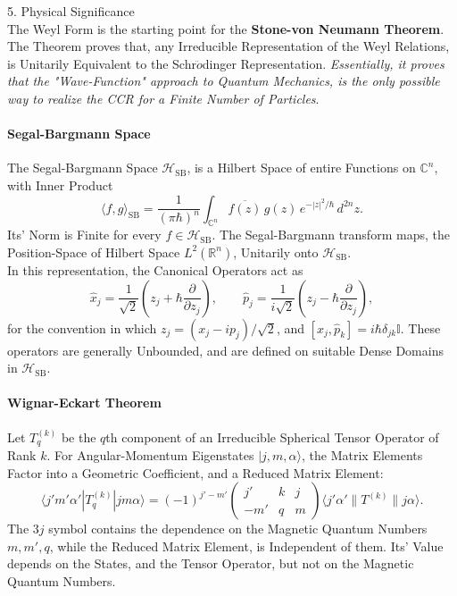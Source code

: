 \documentclass[a4paper, 10pt, onepage]{elegantbook}
\begin{document}
{\noindent

   5. Physical Significance  \\

The Weyl Form is the starting point for the \textbf{Stone-von Neumann Theorem}. The Theorem proves that, any Irreducible Representation of the Weyl Relations, is Unitarily Equivalent to the Schr$\ddot{o}$dinger Representation. \emph{Essentially, it proves that the "Wave-Function" approach to Quantum Mechanics, is the only possible way to realize the CCR for a Finite Number of Particles}. 

\newpage


\paragraph{Segal-Bargmann Space}

The Segal-Bargmann Space $\mathcal{H}_{\mathrm{SB}}$, is a Hilbert Space of entire Functions on $\mathbb{C}^n$, with Inner Product
\[
\langle f,g\rangle_{\mathrm{SB}}
=
\frac{1}{(\pi\hbar)^n}
\int_{\mathbb{C}^n}
\overline{f(z)}\,g(z)\,
e^{-|z|^2/\hbar}\,d^{2n}z.
\]
Its' Norm is Finite for every $f\in\mathcal{H}_{\mathrm{SB}}$. The Segal-Bargmann transform maps, the Position-Space of Hilbert Space $L^2(\mathbb{R}^n)$, Unitarily onto $\mathcal{H}_{\mathrm{SB}}$.  \\

In this representation, the Canonical Operators act as  \\
\[
\hat{x}_j
=
\frac{1}{\sqrt{2}}\left(z_j+\hbar\frac{\partial}{\partial z_j}\right),
\qquad
\hat{p}_j
=
\frac{1}{i\sqrt{2}}\left(z_j-\hbar\frac{\partial}{\partial z_j}\right),
\]
for the convention in which $z_j=(x_j-ip_j)/\sqrt{2}$, and $[\hat{x}_j,\hat{p}_k]=i\hbar\delta_{jk}\mathbb{I}$. These operators are generally Unbounded, and are defined on suitable Dense Domains in $\mathcal{H}_{\mathrm{SB}}$.

\newpage

\paragraph{Wignar-Eckart Theorem}

Let $T^{(k)}_q$ be the $q$th component of an Irreducible Spherical Tensor Operator of Rank $k$. For Angular-Momentum Eigenstates $|j,m,\alpha\rangle$, the Matrix Elements Factor into a Geometric Coefficient, and a Reduced Matrix Element:
\[
\langle j'm'\alpha'|T^{(k)}_q|jm\alpha\rangle
=
(-1)^{j'-m'}
\begin{pmatrix}
j' & k & j \\
-m' & q & m
\end{pmatrix}
\langle j'\alpha'\|T^{(k)}\|j\alpha\rangle .
\]
The $3j$ symbol contains the dependence on the Magnetic Quantum Numbers $m,m',q$, while the Reduced Matrix Element, is Independent of them. Its' Value depends on the States, and the Tensor Operator, but not on the Magnetic Quantum Numbers.  \\

}
\end{document}
